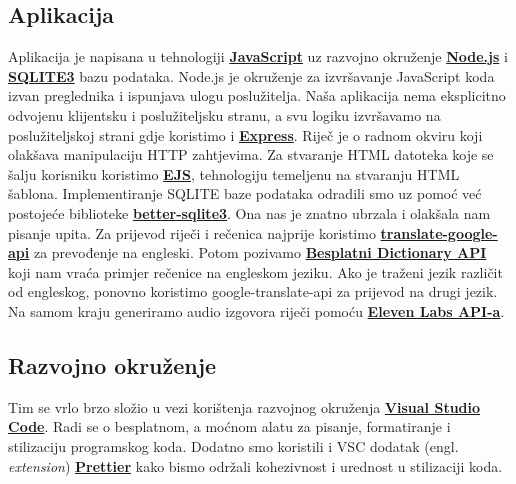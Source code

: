 		\subsection*{Aplikacija}
			Aplikacija je napisana u tehnologiji \textbf{\href{https://developer.mozilla.org/en-US/docs/Web/JavaScript}{JavaScript}} uz razvojno okruženje \textbf{\href{https://nodejs.org/en}{Node.js}} i \textbf{\href{https://www.npmjs.com/package/better-sqlite3}{SQLITE3}} bazu podataka. Node.js je okruženje za izvršavanje JavaScript koda izvan preglednika i ispunjava ulogu poslužitelja. Naša aplikacija nema eksplicitno odvojenu klijentsku i poslužiteljsku stranu, a svu logiku izvršavamo na poslužiteljskoj strani gdje koristimo i \textbf{\href{https://expressjs.com/}{Express}}. Riječ je o radnom okviru koji olakšava manipulaciju HTTP zahtjevima. Za stvaranje HTML datoteka koje se  šalju korisniku koristimo \textbf{\href{https://ejs.co/}{EJS}}, tehnologiju temeljenu na stvaranju HTML šablona. Implementiranje SQLITE baze podataka odradili smo uz pomoć već postojeće biblioteke \textbf{\href{https://www.npmjs.com/package/better-sqlite3}{better-sqlite3}}. Ona nas je znatno ubrzala i olakšala nam pisanje upita. Za prijevod riječi i rečenica najprije koristimo \textbf{\href{https://www.npmjs.com/package/translate-google-api}{translate-google-api}} za prevođenje na engleski. Potom pozivamo \textbf{\href{https://dictionaryapi.dev/}{Besplatni Dictionary API}} koji nam vraća primjer rečenice na engleskom jeziku. Ako je traženi jezik različit od engleskog, ponovno koristimo google-translate-api za prijevod na drugi jezik. Na samom kraju generiramo audio izgovora riječi pomoću \textbf{\href{https://elevenlabs.io/}{Eleven Labs API-a}}.

		\subsection*{Razvojno okruženje}
			Tim se vrlo brzo složio u vezi korištenja razvojnog okruženja \textbf{\href{https://code.visualstudio.com/}{Visual Studio Code}}. Radi se o besplatnom, a moćnom alatu za pisanje, formatiranje i stilizaciju programskog koda. Dodatno smo koristili i VSC dodatak (engl. \textit{extension}) \textbf{\href{https://prettier.io/}{Prettier}} kako bismo održali kohezivnost i urednost u stilizaciji koda.

